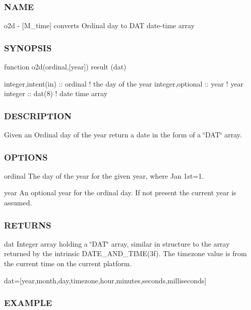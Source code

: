 \begin{DoxyVerb}
\subsubsection*{N\+A\+ME}

o2d -\/ \mbox{[}M\+\_\+time\mbox{]} converts Ordinal day to D\+AT date-\/time array 

\subsubsection*{S\+Y\+N\+O\+P\+S\+IS}

\begin{DoxyVerb}function o2d(ordinal,[year]) result (dat)

 integer,intent(in) :: ordinal  ! the day of the year
 integer,optional   :: year     ! year
 integer            :: dat(8)   ! date time array
\end{DoxyVerb}


\subsubsection*{D\+E\+S\+C\+R\+I\+P\+T\+I\+ON}

Given an Ordinal day of the year return a date in the form of a \char`\"{}\+D\+A\+T\char`\"{} array.

\subsubsection*{O\+P\+T\+I\+O\+NS}

ordinal The day of the year for the given year, where Jan 1st=1.

year An optional year for the ordinal day. If not present the current year is assumed.

\subsubsection*{R\+E\+T\+U\+R\+NS}

dat Integer array holding a \char`\"{}\+D\+A\+T\char`\"{} array, similar in structure to the array returned by the intrinsic D\+A\+T\+E\+\_\+\+A\+N\+D\+\_\+\+T\+I\+M\+E(3f). The timezone value is from the current time on the current platform.

dat=\mbox{[}year,month,day,timezone,hour,minutes,seconds,milliseconds\mbox{]}

\subsubsection*{E\+X\+A\+M\+P\+LE}


\end{DoxyVerb}
